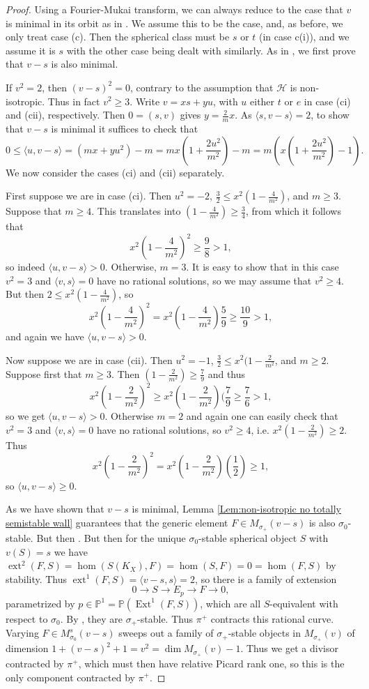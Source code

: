 \documentclass[leqno,11pt]{amsart}
\def\P{\ensuremath{\mathbb{P}}}
\def\dim{\mathop{\mathrm{dim}}\nolimits}
\def\Ext{\mathop{\mathrm{Ext}}\nolimits}
\def\ext{\mathop{\mathrm{ext}}\nolimits}
\theoremstyle{definition}
\def\P{\ensuremath{\mathbb{P}}}
\def\HH{\ensuremath{\mathcal H}}
\begin{document}
\begin{proof}
Using a Fourier-Mukai transform, we can always reduce to the case that $v$ is minimal in its orbit as in \cite[Corollary 7.3, Lemma 7.5]{BM14b}.  We assume this to be the case, and, as before, we only treat case (c).  Then the spherical class must be $s$ or $t$ (in case c(i)), and we assume it is $s$ with the other case being  dealt with similarly.  As in \cite[Lemma 7.4]{BM14b}, we first prove that $v-s$ is also minimal.

If $v^2=2$, then $(v-s)^2=0$, contrary to the assumption that $\HH$ is non-isotropic.  Thus in fact $v^2\geq 3$.  Write $v=xs+yu$, with $u$ either $t$ or $e$ in case (ci) and (cii), respectively.  Then $0=(s,v)$ gives $y=\frac{2}{m}x$.  As $\langle s,v-s\rangle=2$, to show that $v-s$ is minimal it suffices to check that $$0\leq \langle u,v-s\rangle=(mx+yu^2)-m=mx(1+\frac{2u^2}{m^2})-m=m(x(1+\frac{2u^2}{m^2})-1).$$  We now consider the cases (ci) and (cii) separately. 

First suppose we are in case (ci).  Then $u^2=-2$, $\frac{3}{2}\leq x^2(1-\frac{4}{m^2})$, and $m\geq 3$.  Suppose that $m\geq 4$.  This translates into $(1-\frac{4}{m^2})\geq\frac{3}{4}$, from which it follows that $$x^2(1-\frac{4}{m^2})^2\geq\frac{9}{8}>1,$$ so indeed $\langle u,v-s\rangle>0$.  Otherwise, $m=3$.  It is easy to show that in this case $v^2=3$ and $\langle v,s\rangle=0$ have no rational solutions, so we may assume that $v^2\geq 4$.  But then $2\leq x^2(1-\frac{4}{m^2})$, so $$x^2(1-\frac{4}{m^2})^2=x^2(1-\frac{4}{m^2})\frac{5}{9}\geq\frac{10}{9}>1,$$ and again we have $\langle u,v-s\rangle>0$.

Now suppose we are in case (cii).  Then $u^2=-1$, $\frac{3}{2}\leq x^2(1-\frac{2}{m^2}$, and $m\geq 2$.  Suppose first that $m\geq 3$.  Then $(1-\frac{2}{m^2})\geq\frac{7}{9}$ and thus $$x^2(1-\frac{2}{m^2})^2\geq x^2(1-\frac{2}{m^2})(\frac{7}{9}\geq\frac{7}{6}>1,$$ so we get $\langle u,v-s\rangle>0$.  Otherwise $m=2$ and again one can easily check that $v^2=3$ and $\langle v,s\rangle =0$ have no rational solutions, so $v^2\geq 4$, i.e. $x^2(1-\frac{2}{m^2})\geq 2$.  Thus $$x^2(1-\frac{2}{m^2})^2=x^2(1-\frac{2}{m^2})(\frac{1}{2})\geq 1,$$ so $\langle u,v-s\rangle\geq 0$.

As we have shown that $v-s$ is minimal, Lemma \ref{Lem:non-isotropic no totally semistable wall} guarantees that the generic element $F\in M_{\sigma_+}(v-s)$ is also $\sigma_0$-stable.  But then .  But then for the unique $\sigma_0$-stable spherical object $S$ with $v(S)=s$ we have $\ext^2(F,S)=\hom(S(K_X),F)=\hom(S,F)=0=\hom(F,S)$ by stability.  Thus $\ext^1(F,S)=\langle v-s,s\rangle=2$, so there is a family of extension $$0\to S\to E_p\to F\to 0,$$ parametrized by $p\in\P^1=\P(\Ext^1(F,S))$, which are all $S$-equivalent with respect to $\sigma_0$.  By \cite[Lemma 6.9]{BM14b}, they are $\sigma_+$-stable.  Thus $\pi^+$ contracts this rational curve.  Varying $F\in M_{\sigma_0}^s(v-s)$ sweeps out a family of $\sigma_+$-stable objects in $M_{\sigma_+}(v)$ of dimension $1+(v-s)^2+1=v^2=\dim M_{\sigma_+}(v)-1$.  Thus we get a divisor contracted by $\pi^+$, which must then have relative Picard rank one, so this is the only component contracted by $\pi^+$.  



\end{proof}
\end{document}
